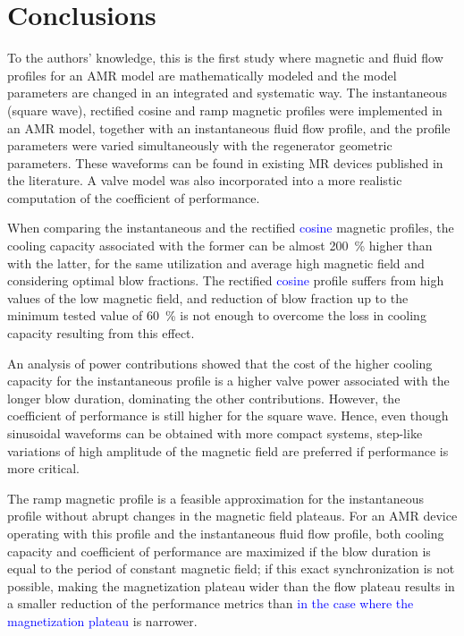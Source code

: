 \documentclass[referee]{svjour3}
\begin{document}
\section{Conclusions}
\label{sec:final-considerations}

To the authors' knowledge, this is the first study where magnetic and fluid flow profiles for an AMR model are mathematically modeled and the model parameters are changed in an integrated and systematic  way. The instantaneous (square wave), rectified cosine and ramp magnetic profiles were implemented in an AMR model, together with an instantaneous fluid flow profile, and the profile parameters were varied simultaneously with the regenerator geometric parameters. These waveforms can be found in existing MR devices published in the literature. A valve model was also incorporated into a more realistic computation of the coefficient of performance.

When comparing the instantaneous  and the rectified \textcolor{blue}{cosine} magnetic profiles, the cooling capacity associated with the former can be almost \SI{200}{\percent} higher than with the latter, for the same utilization and average high magnetic field and considering optimal blow fractions. The rectified \textcolor{blue}{cosine} profile suffers from high values of the low magnetic field, and reduction of blow fraction up to the minimum tested value of \SI{60}{\percent} is not enough to overcome the loss in cooling capacity resulting from this effect. 

An analysis of power contributions showed that the cost of the higher cooling capacity for the instantaneous profile is a higher valve power associated with the longer blow duration, dominating the other contributions. However, the coefficient of performance is still higher for the square wave. Hence, even though sinusoidal waveforms can be obtained with more compact systems, step-like variations of high amplitude of the magnetic field are preferred if performance is more critical.

The ramp magnetic profile is a feasible approximation for the instantaneous profile without abrupt changes in the magnetic field plateaus. For an AMR device operating with this  profile and the instantaneous fluid flow profile, both cooling capacity and coefficient of performance are maximized if the blow duration is equal to the period of constant magnetic field; if this exact synchronization is not possible, making the magnetization plateau wider than the flow plateau results in a smaller reduction of the performance metrics than \textcolor{blue}{in the case where the magnetization plateau} is narrower. 
\end{document}

